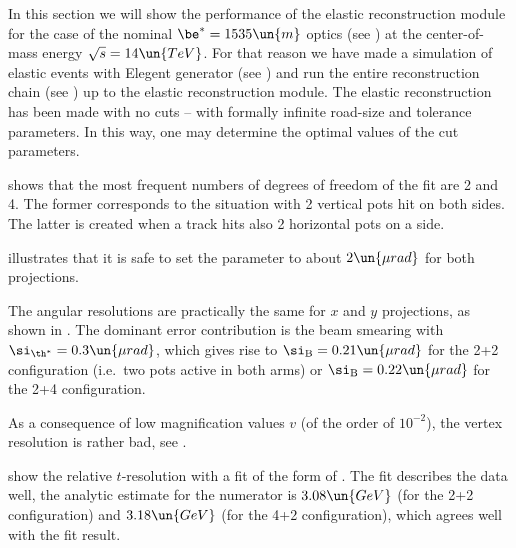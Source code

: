 In this section we will show the performance of the elastic reconstruction module for the case of the nominal $\be^* = 1535\un{m}$ optics (see ) at the center-of-mass energy $\sqrt s = 14\un{TeV}$. For that reason we have made a  simulation of elastic events with Elegent generator (see ) and run the entire reconstruction chain (see ) up to the elastic reconstruction module. The elastic reconstruction has been made with no cuts -- with formally infinite road-size and tolerance parameters. In this way, one may determine the optimal values of the cut parameters.

 shows that the most frequent numbers of degrees of freedom of the fit  are 2 and 4. The former corresponds to the situation with 2 vertical pots hit on both sides. The latter is created when a track hits also 2 horizontal pots on a side.

 illustrates that it is safe to set the  parameter to about $2\un{\mu rad}$ for both projections.

\bmfig
{}
\emfig

The angular resolutions are practically the same for $x$ and $y$ projections, as shown in . The dominant error contribution is the beam smearing with $\si_{\th^*} = 0.3\un{\mu rad}$, which gives rise to $\si_{\rm B} = 0.21 \un{\mu rad}$ for the 2+2 configuration (i.e.~two pots active in both arms) or $\si_{\rm B} = 0.22\un{\mu rad}$ for the 2+4 configuration.

As a consequence of low magnification values $v$ (of the order of $10^{-2}$), the vertex resolution is rather bad, see .

\bmfig
{}
\emfig

 show the relative $t$-resolution with a fit of the form of . The fit describes the data well, the analytic estimate for the numerator is $3.08\un{GeV}$ (for the 2+2 configuration) and $3.18\un{GeV}$ (for the 4+2 configuration), which agrees well with the fit result.

